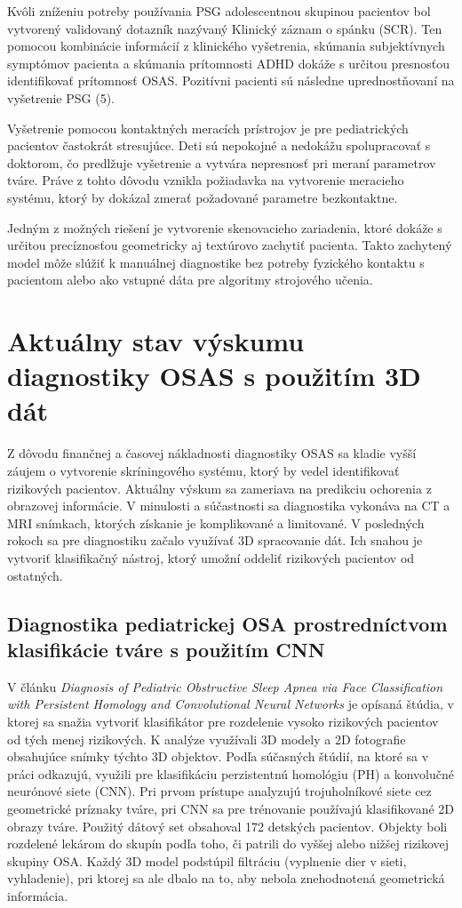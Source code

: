 Kvôli zníženiu potreby používania PSG adolescentnou skupinou pacientov bol vytvorený
validovaný dotazník nazývaný Klinický záznam o spánku (SCR). Ten pomocou kombinácie
informácií z klinického vyšetrenia, skúmania subjektívnych symptómov pacienta a skúmania
prítomnosti ADHD dokáže s určitou presnosťou identifikovať prítomnosť OSAS. Pozitívni
pacienti sú následne uprednostňovaní na vyšetrenie PSG (5).

Vyšetrenie pomocou kontaktných meracích prístrojov je pre pediatrických pacientov častokrát
stresujúce. Deti sú nepokojné a nedokážu spolupracovať s doktorom, čo predlžuje vyšetrenie a vytvára nepresnosť pri meraní parametrov tváre. Práve z tohto dôvodu vznikla požiadavka na vytvorenie meracieho
systému, ktorý by dokázal zmerať požadované parametre bezkontaktne.

Jedným z možných riešení je vytvorenie skenovacieho zariadenia, ktoré dokáže s určitou
precíznosťou geometricky aj textúrovo zachytiť pacienta. Takto zachytený model môže slúžiť k manuálnej diagnostike bez potreby fyzického kontaktu s pacientom alebo ako vstupné dáta pre algoritmy strojového učenia.

\section{Aktuálny stav výskumu diagnostiky OSAS s použitím 3D dát}

Z dôvodu finančnej a časovej nákladnosti diagnostiky OSAS sa kladie vyšší záujem o vytvorenie skríningového systému, ktorý by vedel identifikovať rizikových pacientov. Aktuálny výskum sa zameriava na predikciu ochorenia z obrazovej informácie. V minulosti a súčastnosti sa diagnostika vykonáva na CT a MRI snímkach, ktorých získanie je komplikované a limitované. V posledných rokoch sa pre diagnostiku začalo využívať 3D spracovanie dát. Ich snahou je vytvoriť klasifikačný nástroj, ktorý umožní oddeliť rizikových pacientov od ostatných. 

\newpage
\subsection{Diagnostika pediatrickej OSA prostredníctvom klasifikácie tváre s použitím CNN}

V článku \textit{Diagnosis of Pediatric Obstructive Sleep Apnea via Face Classification with Persistent Homology and Convolutional Neural Networks} je opísaná štúdia, v ktorej sa snažia vytvoriť klasifikátor pre rozdelenie vysoko rizikových pacientov od tých menej rizikových. K analýze využívali 3D modely a 2D fotografie obsahujúce snímky týchto 3D objektov. Podľa súčasných štúdií, na ktoré sa v práci odkazujú, využili pre klasifikáciu perzistentnú homológiu (PH) a konvolučné neurónové siete (CNN). Pri prvom prístupe analyzujú trojuholníkové siete cez geometrické príznaky tváre, pri CNN sa pre trénovanie používajú klasifikované 2D obrazy tváre. Použitý dátový set obsahoval 172 detských pacientov. Objekty boli rozdelené lekárom do skupín podľa toho, či patrili do vyššej alebo nižšej rizikovej skupiny OSA. Každý 3D model podstúpil filtráciu (vyplnenie dier v sieti, vyhladenie), pri ktorej sa ale dbalo na to, aby nebola znehodnotená geometrická informácia. 

